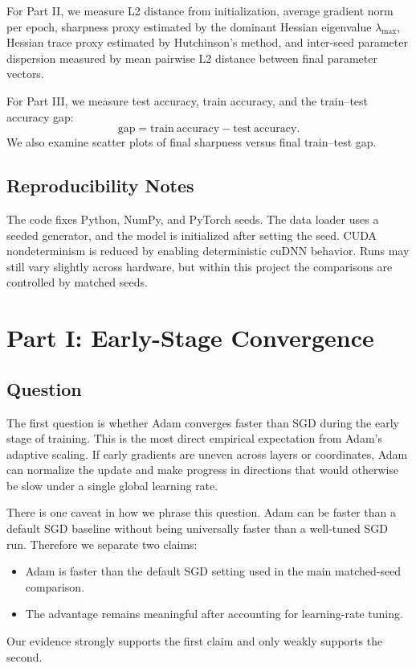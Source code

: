 \documentclass[11pt]{article}
\begin{document}
For Part II, we measure L2 distance from initialization, average gradient norm per epoch, sharpness proxy estimated by the dominant Hessian eigenvalue $\lambda_{\max}$, Hessian trace proxy estimated by Hutchinson's method, and inter-seed parameter dispersion measured by mean pairwise L2 distance between final parameter vectors.

For Part III, we measure test accuracy, train accuracy, and the train--test accuracy gap:
\[
\mathrm{gap} = \mathrm{train\ accuracy} - \mathrm{test\ accuracy}.
\]
We also examine scatter plots of final sharpness versus final train--test gap.

\subsection{Reproducibility Notes}

The code fixes Python, NumPy, and PyTorch seeds. The data loader uses a seeded generator, and the model is initialized after setting the seed. CUDA nondeterminism is reduced by enabling deterministic cuDNN behavior. Runs may still vary slightly across hardware, but within this project the comparisons are controlled by matched seeds.

\section{Part I: Early-Stage Convergence}

\subsection{Question}

The first question is whether Adam converges faster than SGD during the early stage of training. This is the most direct empirical expectation from Adam's adaptive scaling. If early gradients are uneven across layers or coordinates, Adam can normalize the update and make progress in directions that would otherwise be slow under a single global learning rate.

There is one caveat in how we phrase this question. Adam can be faster than a default SGD baseline without being universally faster than a well-tuned SGD run. Therefore we separate two claims:
\begin{itemize}
    \item Adam is faster than the default SGD setting used in the main matched-seed comparison.
    \item The advantage remains meaningful after accounting for learning-rate tuning.
\end{itemize}
Our evidence strongly supports the first claim and only weakly supports the second.
\end{document}
